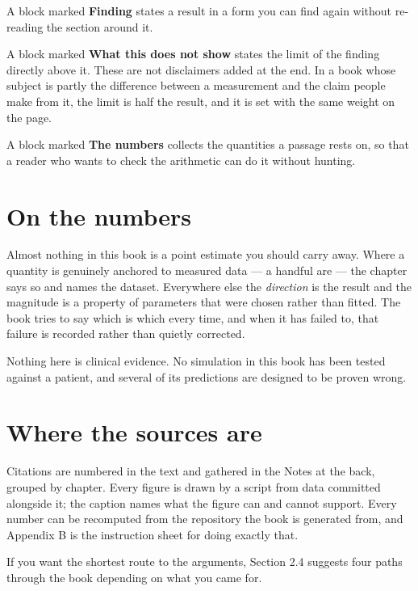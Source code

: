 \documentclass[11pt,twoside,openright]{report}
\begin{document}
A block marked \textbf{Finding} states a result in a form you can find again without re-reading the section around it.

A block marked \textbf{What this does not show} states the limit of the finding directly above it. These are not disclaimers added at the end. In a book whose subject is partly the difference between a measurement and the claim people make from it, the limit is half the result, and it is set with the same weight on the page.

A block marked \textbf{The numbers} collects the quantities a passage rests on, so that a reader who wants to check the arithmetic can do it without hunting.

\section*{On the numbers}

Almost nothing in this book is a point estimate you should carry away. Where a quantity is genuinely anchored to measured data --- a handful are --- the chapter says so and names the dataset. Everywhere else the \textit{direction} is the result and the magnitude is a property of parameters that were chosen rather than fitted. The book tries to say which is which every time, and when it has failed to, that failure is recorded rather than quietly corrected.

Nothing here is clinical evidence. No simulation in this book has been tested against a patient, and several of its predictions are designed to be proven wrong.

\section*{Where the sources are}

Citations are numbered in the text and gathered in the Notes at the back, grouped by chapter. Every figure is drawn by a script from data committed alongside it; the caption names what the figure can and cannot support. Every number can be recomputed from the repository the book is generated from, and Appendix B is the instruction sheet for doing exactly that.

If you want the shortest route to the arguments, Section 2.4 suggests four paths through the book depending on what you came for.

\cleardoublepage
{}

\end{document}
